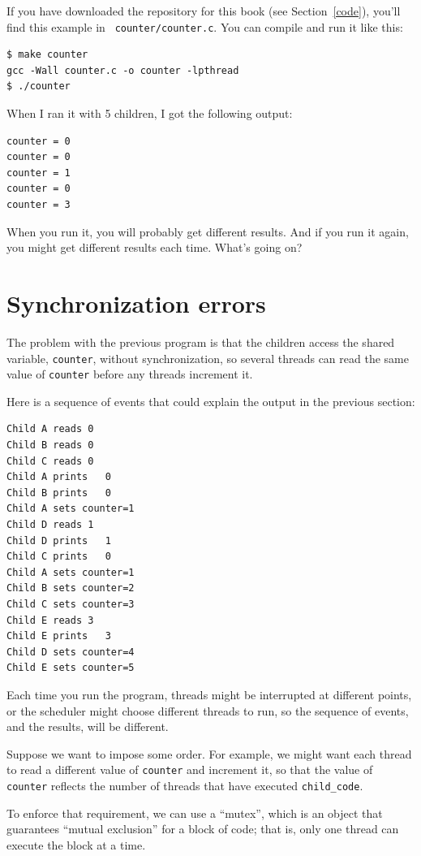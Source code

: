 \documentclass[12pt]{book}
\begin{document}
{If you have downloaded the repository for this book (see
Section~\ref{code}), you'll find this example in {\tt
  counter/counter.c}.  You can compile and run it like this:

\begin{verbatim}
$ make counter
gcc -Wall counter.c -o counter -lpthread
$ ./counter
\end{verbatim}

When I ran it with 5 children, I got the following output:

\begin{verbatim}
counter = 0
counter = 0
counter = 1
counter = 0
counter = 3
\end{verbatim}

When you run it, you will probably get different results.  And if
you run it again, you might get different results each time.  What's
going on?


\section{Synchronization errors}

The problem with the previous program is that the children
access the shared variable, {\tt counter}, without synchronization,
so several threads can read the same value of {\tt counter} before
any threads increment it.

Here is a sequence of events that could explain the output in the
previous section:

\begin{verbatim}
Child A reads 0
Child B reads 0
Child C reads 0
Child A prints   0
Child B prints   0
Child A sets counter=1
Child D reads 1
Child D prints   1
Child C prints   0
Child A sets counter=1
Child B sets counter=2
Child C sets counter=3
Child E reads 3
Child E prints   3
Child D sets counter=4
Child E sets counter=5
\end{verbatim}

Each time you run the program, threads might be interrupted at different
points, or the scheduler might choose different threads to run, so
the sequence of events, and the results, will be different.

Suppose we want to impose some order.  For example, we might want
each thread to read a different value of {\tt counter} and increment
it, so that the value of {\tt counter} reflects the number of
threads that have executed \verb"child_code".

To enforce that requirement, we can use a ``mutex'', which is
an object that guarantees ``mutual exclusion'' for a block of code;
that is, only one thread can execute the block at a time.

}
\end{document}
